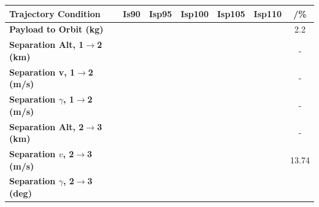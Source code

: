 \begin{table}[ht!]
	\centering
	\begin{tabular}{l c c c c c c} 
		\hline \textbf{Trajectory Condition}
		&Is90
		&Isp95
		&Isp100
		&Isp105
		&Isp110
		& /\%
		\\
		\hline \textbf{Payload to Orbit (kg)}
		& \PayloadToOrbitIspNinetyNoReturn
		& \PayloadToOrbitIspNinetyFiveNoReturn
		& \PayloadToOrbitIspStandardNoReturn
		& \PayloadToOrbitIspOneHundredFiveNoReturn
		& \PayloadToOrbitIspOneHundredTenNoReturn
		&2.2
		\\
		\textbf{Separation Alt, 1$\rightarrow$2 (km)}
		& \firstsecondSeparationAltIspNinetyNoReturn
		& \firstsecondSeparationAltIspNinetyFiveNoReturn
		& \firstsecondSeparationAltIspStandardNoReturn
		& \firstsecondSeparationAltIspOneHundredFiveNoReturn
		& \firstsecondSeparationAltIspOneHundredTenNoReturn
		& -
		\\
		\textbf{Separation v, 1$\rightarrow$2 (m/s)}
		& \firstsecondSeparationvIspNinetyNoReturn
		& \firstsecondSeparationvIspNinetyFiveNoReturn
		& \firstsecondSeparationvIspStandardNoReturn
		& \firstsecondSeparationvIspOneHundredFiveNoReturn
		& \firstsecondSeparationvIspOneHundredTenNoReturn
		& -
		\\
		\textbf{Separation $\gamma$, 1$\rightarrow$2 (m/s)}
		& \firstsecondSeparationgammaIspNinetyNoReturn
		& \firstsecondSeparationgammaIspNinetyFiveNoReturn
		& \firstsecondSeparationgammaIspStandardNoReturn
		& \firstsecondSeparationgammaIspOneHundredFiveNoReturn
		& \firstsecondSeparationgammaIspOneHundredTenNoReturn
		& -
		\\
		\textbf{Separation Alt, 2$\rightarrow$3 (km)}
		& \secondthirdSeparationAltIspNinetyNoReturn
		& \secondthirdSeparationAltIspNinetyFiveNoReturn
		& \secondthirdSeparationAltIspStandardNoReturn
		& \secondthirdSeparationAltIspOneHundredFiveNoReturn
		& \secondthirdSeparationAltIspOneHundredTenNoReturn
		& -
		\\
		\textbf{Separation $v$, 2$\rightarrow$3 (m/s)}
		& \secondthirdSeparationvIspNinetyNoReturn
		& \secondthirdSeparationvIspNinetyFiveNoReturn
		& \secondthirdSeparationvIspStandardNoReturn
		& \secondthirdSeparationvIspOneHundredFiveNoReturn
		& \secondthirdSeparationvIspOneHundredTenNoReturn
		&13.74
		\\
		\textbf{Separation $\gamma$, 2$\rightarrow$3 (deg)}
		& \secondthirdSeparationgammaIspNinetyNoReturn
		& \secondthirdSeparationgammaIspNinetyFiveNoReturn
		& \secondthirdSeparationgammaIspStandardNoReturn
		& \secondthirdSeparationgammaIspOneHundredFiveNoReturn

\end{tabular}
\end{table}
